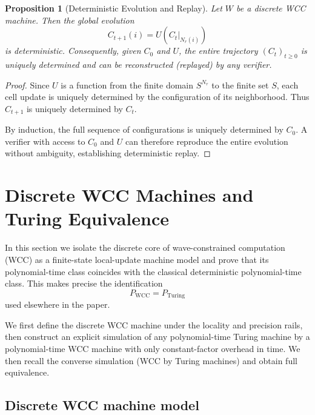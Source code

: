 \documentclass[12pt]{article}
\newtheorem{proposition}[theorem]{Proposition}
\begin{document}

\begin{proposition}[Deterministic Evolution and Replay]
\label{prop:deterministic-replay}
Let $W$ be a discrete WCC machine.
Then the global evolution
\[
   C_{t+1}(i) = U(C_t|_{N_r(i)})
\]
is deterministic. Consequently, given $C_0$ and $U$, the entire
trajectory $(C_t)_{t \ge 0}$ is uniquely determined and can be
reconstructed (replayed) by any verifier.
\end{proposition}

\begin{proof}
Since $U$ is a function from the finite domain
$S^{N_r}$ to the finite set $S$, each cell update is uniquely
determined by the configuration of its neighborhood. Thus $C_{t+1}$ is
uniquely determined by $C_t$.

By induction, the full sequence of configurations is uniquely
determined by $C_0$. A verifier with access to $C_0$ and $U$ can
therefore reproduce the entire evolution without ambiguity,
establishing deterministic replay.
\end{proof}



\section{Discrete WCC Machines and Turing Equivalence}
\label{sec:tm_wcc_equiv}

In this section we isolate the discrete core of wave-constrained computation
(WCC) as a finite-state local-update machine model and prove that its
polynomial-time class coincides with the classical deterministic polynomial-time
class. This makes precise the identification
\[
P_{\mathrm{WCC}} = P_{\mathrm{Turing}}
\]
used elsewhere in the paper.

We first define the discrete WCC machine under the locality and precision rails,
then construct an explicit simulation of any polynomial-time Turing machine by a
polynomial-time WCC machine with only constant-factor overhead in time. We then
recall the converse simulation (WCC by Turing machines) and obtain full
equivalence.

\subsection{Discrete WCC machine model}
\end{document}
